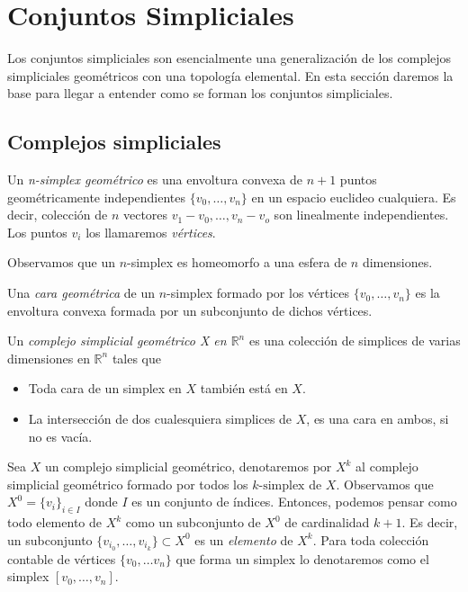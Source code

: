 \documentclass[../main.tex]{subfiles}
\begin{document}
\section{Conjuntos Simpliciales}
Los conjuntos simpliciales son esencialmente una generalizaci\'on de los complejos simpliciales geom\'etricos con una topolog\'ia elemental. En esta secci\'on daremos la base para llegar a entender como se forman los conjuntos simpliciales.
\subsection{Complejos simpliciales}
\begin{defi}
    Un \emph{n-simplex geom\'etrico} es una envoltura convexa de $n+1$ puntos geom\'etricamente independientes $\{v_0,\dots,v_n\}$ en un espacio euclideo cualquiera. Es decir, colecci\'on de $n$ vectores $v_1-v_0,\dots,v_n-v_o$ son linealmente independientes.
    Los puntos $v_i$ los llamaremos \emph{v\'ertices}.

    Observamos que un $n$-simplex es homeomorfo a una esfera de $n$ dimensiones.
\end{defi}
\begin{defi}
    Una \emph{cara geom\'etrica} de un $n$-simplex formado por los v\'ertices $\{v_0,\dots,v_n\}$ es la envoltura convexa formada por un subconjunto de dichos v\'ertices.
\end{defi}
\begin{defi}
    Un \emph{complejo simplicial geom\'etrico X en $\mathbb{R}^n$} es una colecci\'on de simplices de varias dimensiones en $\mathbb{R}^n$ tales que
    \begin{itemize}
        \item Toda cara de un simplex en $X$ tambi\'en est\'a en $X$.
        \item La intersecci\'on de dos cualesquiera simplices de $X$, es una cara en ambos, si no es vac\'ia.
    \end{itemize}
\end{defi}

Sea $X$ un complejo simplicial geom\'etrico, denotaremos por  $X^k$ al complejo simplicial geom\'etrico formado por todos los $k\text{-simplex}$ de $X$.
Observamos que $X^0 = \{v_i\}_{i\in I}$ donde $I$ es un conjunto de \'indices. Entonces, podemos pensar como todo elemento de $X^k$ como un subconjunto de $X^0$ de cardinalidad $k+1$.
Es decir, un subconjunto $\{v_{i_0},\dots,v_{i_k}\}\subset X^0$ es un \emph{elemento} de $X^k$.
Para toda colecci\'on contable de v\'ertices $\{v_0,\dots v_n\}$ que forma un simplex lo denotaremos como el simplex $[v_0,\dots,v_n]$.
\end{document}
